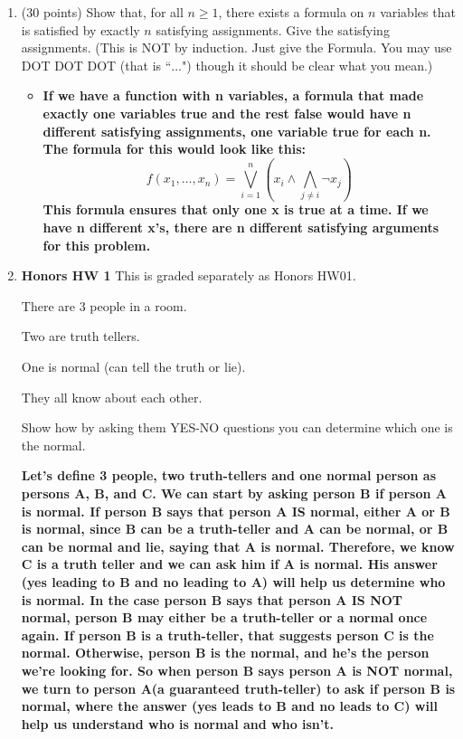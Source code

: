 \documentclass[12pt]{article}
\begin{document}
\begin{enumerate}
\newpage

\item
(30 points)
Show that, for all $n\ge 1$, there exists a formula on $n$ variables that is satisfied by
exactly $n$ satisfying assignments. Give the satisfying assignments.
(This is NOT by induction. Just give
the Formula. You may use DOT DOT DOT (that is ``$\dots$") though it should be clear what you mean.)

\begin{itemize}
    \item \textbf{If we have a function with n variables, a formula that made exactly one variables true and the rest false would have n different satisfying assignments, one variable true for each n. The formula for this would look like this: } \vspace{0.3cm} $$ f(x_1, \dots , x_n) = \bigvee_{i=1}^n \left ( x_i \wedge \bigwedge_{j \ne i} \neg x_j \right)$$ \vspace{0.3cm} 
    \textbf{This formula ensures that only one x is true at a time. If we have n different x's, there are n different satisfying arguments for this problem.}
    
\end{itemize}

\newpage
\item 
{\bf Honors HW 1} This is graded separately as Honors HW01.

There are 3 people in a room.

Two are truth tellers.

One is normal (can tell the truth or lie).

They all know about each other. 

Show how by asking them YES-NO questions you can determine which one is the normal. 

\textbf{Let's define 3 people, two truth-tellers and one normal person as persons A, B, and C. We can start by asking person B if person A is normal. If person B says that person A IS normal, either A or B is normal, since B can be a truth-teller and A can be normal, or B can be normal and lie, saying that A is normal. Therefore, we know C is a truth teller and we can ask him if A is normal. His answer (yes leading to B and no leading to A) will help us determine who is normal. In the case person B says that person A IS NOT normal, person B may either be a truth-teller or a normal once again. If person B is a truth-teller, that suggests person C is the normal. Otherwise, person B is the normal, and he's the person we're looking for. So when person B says person A is NOT normal, we turn to person A(a guaranteed truth-teller) to ask if person B is normal, where the answer (yes leads to B and no leads to C) will help us understand who is normal and who isn't.}

\bigskip

\end{enumerate}
\end{document}
